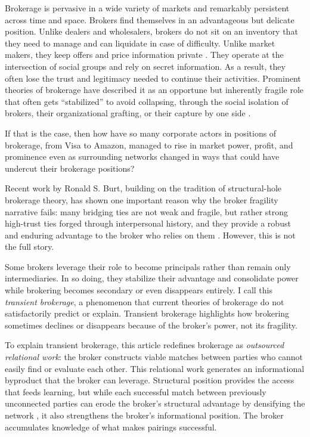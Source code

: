 \documentclass[
]{article}
\begin{document}
Brokerage is pervasive in a wide variety of markets and remarkably persistent across time and space. Brokers find themselves in an advantageous but delicate position. Unlike dealers and wholesalers, brokers do not sit on an inventory that they need to manage and can liquidate in case of difficulty. Unlike market makers, they keep offers and price information private \autocite{rustMiddlemenMarketMakers2003}. They operate at the intersection of social groups \autocite{burtStructuralHolesSocial1992,burtStructuralHolesGood2004} and rely on secret information. As a result, they often lose the trust and legitimacy needed to continue their activities. Prominent theories of brokerage have described it as an opportune but inherently fragile role that often gets ``stabilized'' to avoid collapsing, through the social isolation of brokers, their organizational grafting, or their capture by one side \autocite{stovelStabilizingBrokerage2011}.

If that is the case, then how have so many corporate actors in positions of brokerage, from Visa to Amazon, managed to rise in market power, profit, and prominence even as surrounding networks changed in ways that could have undercut their brokerage positions?

Recent work by Ronald S. Burt, building on the tradition of structural-hole brokerage theory, has shown one important reason why the broker fragility narrative fails: many bridging ties are not weak and fragile, but rather strong high-trust ties forged through interpersonal history, and they provide a robust and enduring advantage to the broker who relies on them \autocite{burtFragileBrokerage,burtStrongBridgesTrust2026a}. However, this is not the full story.

Some brokers leverage their role to become principals rather than remain only intermediaries. In so doing, they stabilize their advantage and consolidate power while brokering becomes secondary or even disappears entirely. I call this \emph{transient brokerage}, a phenomenon that current theories of brokerage do not satisfactorily predict or explain. Transient brokerage highlights how brokering sometimes declines or disappears because of the broker's power, not its fragility.

To explain transient brokerage, this article redefines brokerage as \emph{outsourced relational work}: the broker constructs viable matches between parties who cannot easily find or evaluate each other. This relational work generates an informational byproduct that the broker can leverage. Structural position provides the access that feeds learning, but while each successful match between previously unconnected parties can erode the broker's structural advantage by densifying the network \autocite[356]{burtNetworkStructureSocial2000}, it also strengthens the broker's informational position. The broker accumulates knowledge of what makes pairings successful.
\end{document}
